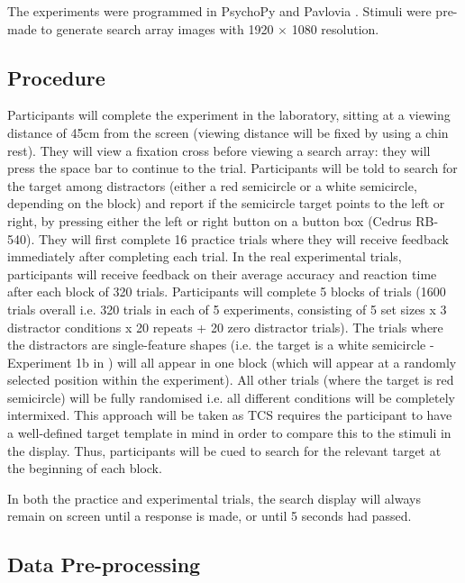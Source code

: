 \documentclass[preprint,12pt,authoryear]{elsarticle}
\begin{document}
The experiments were programmed in PsychoPy and Pavlovia \citep{peirce2019psychopy2}. Stimuli were pre-made to generate search array images with 1920 $\times$ 1080 resolution. 

\subsection{Procedure}

Participants will complete the experiment in the laboratory, sitting at a viewing distance of 45cm from the screen (viewing distance will be fixed by using a chin rest). They will view a fixation cross before viewing a search array: they will press the space bar to continue to the trial. Participants will be told to search for the target among distractors (either a red semicircle or a white semicircle, depending on the block) and report if the semicircle target points to the left or right, by pressing either the left or right button on a button box (Cedrus RB-540). They will first complete 16 practice trials where they will receive feedback immediately after completing each trial. In the real experimental trials, participants will receive feedback on their average accuracy and reaction time after each block of 320 trials. Participants will complete 5 blocks of trials (1600 trials overall i.e. 320 trials in each of 5 experiments, consisting of 5 set sizes x 3 distractor conditions x 20 repeats + 20 zero distractor trials). The trials where the distractors are single-feature shapes (i.e. the target is a white semicircle - Experiment 1b in \cite{buetti2019predicting}) will all appear in one block (which will appear at a randomly selected position within the experiment). All other trials (where the target is red semicircle) will be fully randomised i.e. all different conditions will be completely intermixed. This approach will be taken as TCS requires the participant to have a well-defined target template in mind in order to compare this to the stimuli in the display. Thus, participants will be cued to search for the relevant target at the beginning of each block.

In both the practice and experimental trials, the search display will always remain on screen until a response is made, or until 5 seconds had passed. 

\subsection{Data Pre-processing}
\label{sec:preproc}
\end{document}
